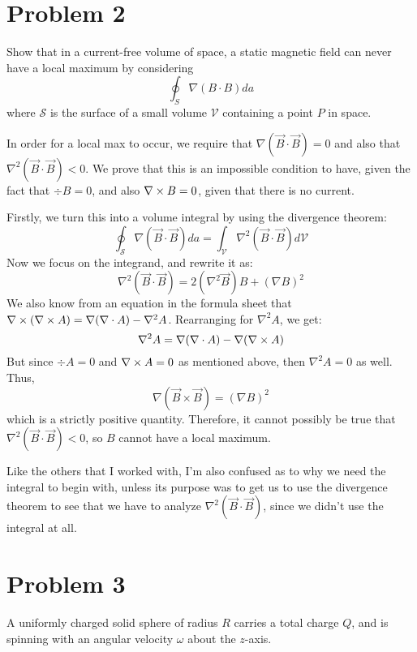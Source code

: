 \documentclass[10pt]{article}
\begin{document}
	\pagebreak

	\section*{Problem 2}
	Show that in a current-free volume of space, a static magnetic field can never have a local maximum by 
	considering 
	\[
		\oint_S \nabla(B \cdot B) da
	\] 
	where $\mathcal S$ is the surface of a small volume $\mathcal V$ containing a point $P$ in space. 

	\begin{solution}
		In order for a local max to occur, we require that $\nabla(\vec B \cdot \vec B) = 0$ and also that
		$\nabla^2 (\vec B \cdot \vec B) < 0$. We prove that this is an impossible condition to have, given 
		the fact that $\div B = 0$, and also $\nabla \times B = 0$, given that there is no current.  

		Firstly, we turn this into a volume integral by using the divergence theorem:
		\[
			\oint_{\mathcal S} \nabla (\vec B \cdot \vec B) da = \int_{\mathcal V} \nabla^2 (\vec B \cdot \vec B)
			d\mathcal V
		\] 
		Now we focus on the integrand, and rewrite it as:
		\[
			\nabla^2(\vec B \cdot \vec B) = 2(\nabla^2 \vec B) B + (\nabla B)^2
		\] 
		We also know from an equation in the formula sheet that $\nabla \times(\nabla \times A) = \nabla(\nabla \cdot A) - \nabla^2 A$. 
		Rearranging for $\nabla^2 A$, we get:
		\[
		\nabla^2 A = \nabla(\nabla \cdot A) - \nabla(\nabla \times A)
		\] 
		But since $\div A = 0$ and $\nabla \times A = 0$ as mentioned above, then $\nabla^2 A = 0$ as well. Thus, 
		\[
		\nabla(\vec B \times \vec B) = (\nabla B)^2
		\]
		which is a strictly positive quantity. Therefore, it cannot possibly be true that $\nabla^2 (\vec B 
		\cdot \vec B) < 0$, so $B$ cannot have a local maximum. 

		Like the others that I worked with, I'm also confused as to why we need the integral to begin with, unless its purpose 
		was to get us to use the divergence theorem to see that we have to analyze 
		$\nabla^2 (\vec B \cdot \vec B)$, since we didn't use the integral at all.
	\end{solution}

	\pagebreak
	\section*{Problem 3}

	A uniformly charged solid sphere of radius $R$ carries a total charge $Q$, and is spinning with an angular
	velocity $\omega$ about the $z$-axis. 
\end{document}
